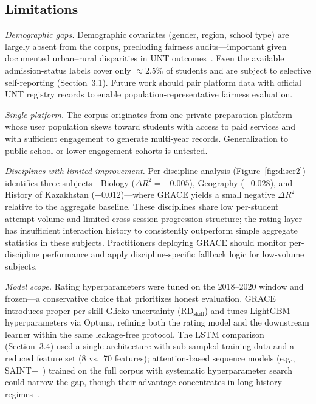 \documentclass[11pt]{article}
\begin{document}
\subsection{Limitations}

\textit{Demographic gaps.}\quad
Demographic covariates (gender, region, school type) are largely absent from the corpus,
precluding fairness audits---important given documented urban--rural disparities in
UNT outcomes~\cite{oecd2017}.
Even the available admission-status labels cover only $\approx$2.5\% of students
and are subject to selective self-reporting (Section~3.1).
Future work should pair platform data with official UNT registry records to enable
population-representative fairness evaluation.

\textit{Single platform.}\quad
The corpus originates from one private preparation platform whose user population
skews toward students with access to paid services and with sufficient engagement to
generate multi-year records.
Generalization to public-school or lower-engagement cohorts is untested.

\begin{sloppypar}
\textit{Disciplines with limited improvement.}\quad
Per-discipline analysis (Figure~\ref{fig:discr2}) identifies three subjects---Biology
($\Delta R^{2} = -0.005$), Geography ($-0.028$), and History of Kazakhstan ($-0.012$)---where
GRACE yields a small negative $\Delta R^{2}$ relative to the aggregate baseline.
These disciplines share low per-student attempt volume and limited cross-session
progression structure; the rating layer has insufficient interaction history to
consistently outperform simple aggregate statistics in these subjects.
Practitioners deploying GRACE should monitor per-discipline performance and apply
discipline-specific fallback logic for low-volume subjects.
\end{sloppypar}

\textit{Model scope.}\quad
Rating hyperparameters were tuned on the 2018--2020 window and frozen---a
conservative choice that prioritizes honest evaluation.
GRACE introduces proper per-skill Glicko uncertainty ($\mathrm{RD}_{\text{skill}}$)
and tunes LightGBM hyperparameters via Optuna, refining both the rating model and the
downstream learner within the same leakage-free protocol.
The LSTM comparison (Section~3.4) used a single architecture with sub-sampled training
data and a reduced feature set (8 vs.\ 70 features); attention-based
sequence models (e.g., SAINT+~\cite{shin2021}) trained on the full corpus with systematic
hyperparameter search could narrow the gap, though their advantage concentrates in
long-history regimes~\cite{liu2021}.
\end{document}
